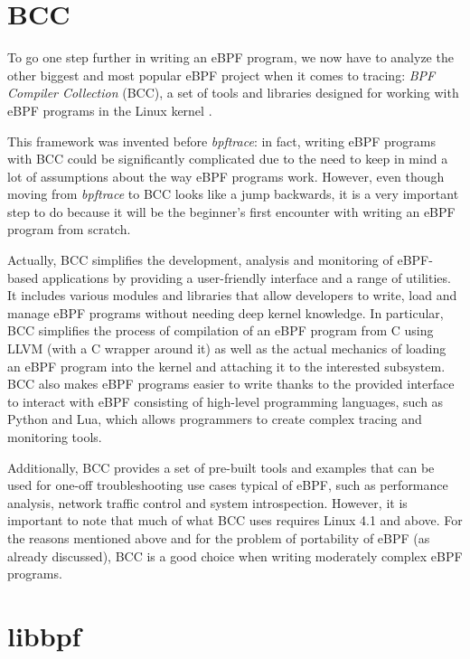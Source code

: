 \section{BCC}

To go one step further in writing an eBPF program, we now have to analyze the other biggest and most popular eBPF project when it comes to tracing: \textit{BPF Compiler Collection} (BCC), a set of tools and libraries designed for working with eBPF programs in the Linux kernel \cite{BCCRepo}.

This framework was invented before \textit{bpftrace}: in fact, writing eBPF programs with BCC could be significantly complicated due to the need to keep in mind a lot of assumptions about the way eBPF programs work.
However, even though moving from \textit{bpftrace} to BCC looks like a jump backwards, it is a very important step to do because it will be the beginner's first encounter with writing an eBPF program from scratch.
 
Actually, BCC simplifies the development, analysis and monitoring of eBPF-based applications by providing a user-friendly interface and a range of utilities. 
It includes various modules and libraries that allow developers to write, load and manage eBPF programs without needing deep kernel knowledge. 
In particular, BCC simplifies the process of compilation of an eBPF program from C using LLVM (with a C wrapper around it) as well as the actual mechanics of loading an eBPF program into the kernel and attaching it to the interested subsystem.
BCC also makes eBPF programs easier to write thanks to the provided interface to interact with eBPF consisting of high-level programming languages, such as Python and Lua, which allows programmers to create complex tracing and monitoring tools.

Additionally, BCC provides a set of pre-built tools and examples that can be used for one-off troubleshooting use cases typical of eBPF, such as performance analysis, network traffic control and system introspection.
However, it is important to note that much of what BCC uses requires Linux 4.1 and above.
For the reasons mentioned above and for the problem of portability of eBPF (as already discussed), BCC is a good choice when writing moderately complex eBPF programs.

\section{libbpf}

